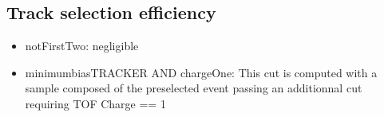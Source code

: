 \documentclass[fleqn,twoside]{article}
\begin{document}
\subsection{Track selection efficiency}
\begin{itemize}
\item notFirstTwo: negligible
\item minimumbiasTRACKER AND chargeOne:
  This cut is computed with a sample composed of the preselected event passing an additionnal cut requiring TOF Charge == 1
\end{itemize}


\begin{thebibliography}{99}

\end{thebibliography}
\end{document}
